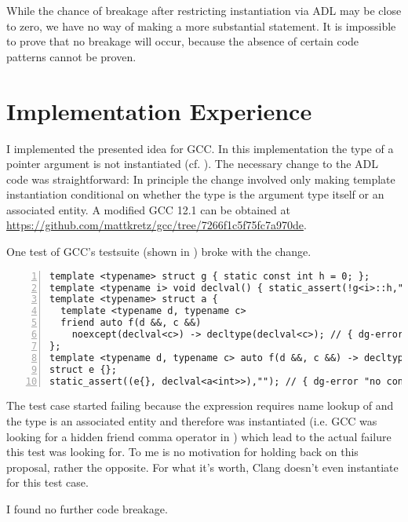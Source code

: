 While the chance of breakage after restricting instantiation via ADL may be close to zero, 
we have no way of making a more substantial statement. It is impossible to prove that no 
breakage will occur, because the absence of certain code patterns cannot be proven.

\section{Implementation Experience}

I implemented the presented idea for GCC. In this implementation the type of a pointer 
argument is not instantiated (cf. ). The necessary change to the ADL 
code was straightforward: In principle the change involved only making template 
instantiation conditional on whether the type is the argument type itself or an associated 
entity.
A modified GCC 12.1 can be obtained at 
\url{https://github.com/mattkretz/gcc/tree/7266f1c5f75fc7a970de}.

One test of GCC's testsuite (shown in ) broke with the change.
\begin{lstlisting}[style=Vc,numbers=left,float={hbtp},label=lst:noexcept41,caption={
GCC test that broke after implementation of less eager ADL (\code{declval<a<int>>} without 
parenthesis is no error --- with parenthesis \code{a<int>} isn't an associated entity)}]
template <typename> struct g { static const int h = 0; };
template <typename i> void declval() { static_assert(!g<i>::h,""); }
template <typename> struct a {
  template <typename d, typename c>
  friend auto f(d &&, c &&)
    noexcept(declval<c>) -> decltype(declval<c>); // { dg-error "different exception" }
};
template <typename d, typename c> auto f(d &&, c &&) -> decltype(declval<c>);
struct e {};
static_assert((e{}, declval<a<int>>),""); // { dg-error "no context to resolve type" }
\end{lstlisting}
The test case started failing because the expression  
requires name lookup of  and the type  is an associated 
entity and therefore was instantiated (i.e. GCC was looking for a hidden friend comma 
operator in ) which lead to the actual failure this test was looking for. To 
me  is no motivation for holding back on this proposal, rather the 
opposite. For what it's worth, Clang doesn't even instantiate  for this test 
case.

I found no further code breakage.

